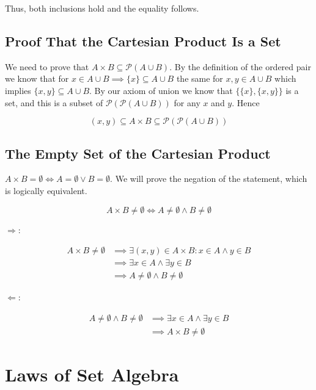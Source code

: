 Thus, both inclusions hold and the equality follows.

\QED

\subsection{Proof That the Cartesian Product Is a Set}

We need to prove that \(A \times B \subseteq \mathcal{P}(A \cup B)\). By the definition of the ordered pair we know that
for \(x \in A \cup B \implies \{x\} \subseteq A \cup B\) the same for \(x,y \in A \cup B\) which implies
\(\{x, y\} \subseteq A \cup B\). By our axiom of union we know that \(\{\{x\}, \{x, y\}\}\) is a set, and this is a
subset of \(\mathcal{P}(\mathcal{P}(A \cup B))\) for any \(x\) and \(y\). Hence

\[
	(x, y) \subseteq A \times B \subseteq \mathcal{P}(\mathcal{P}(A \cup B))
\]

\QED

\subsection{The Empty Set of the Cartesian Product}

\(A \times B = \emptyset \iff A = \emptyset \lor B = \emptyset\). We will prove the negation of the
statement, which is logically equivalent.

\[
	A \times B \ne \emptyset \iff A \neq \emptyset \land B \neq \emptyset
\]

\(\Rightarrow\):

\begin{align*}
	A \times B \ne \emptyset & \implies \exists (x,y) \in A \times B: x \in A \land y \in B \\
	                         & \implies \exists x \in A \land \exists y \in B               \\
	                         & \implies A \neq \emptyset \land B \neq \emptyset
\end{align*}


\(\Leftarrow\):

\begin{align*}
	A \neq \emptyset \land B \neq \emptyset & \implies\exists x \in A \land \exists y \in B \\
	                                        & \implies A \times B \neq \emptyset
\end{align*}

\QED

\section{Laws of Set Algebra}

